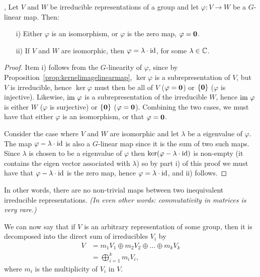 \begin{theorem}\cite[Lemma.1.7.]{FultonHarris}, \cite[Prop.2.4.]{Serre}\label{thm:schur}
	Let $V$ and $W$ be irreducible representations of a group and let $\varphi: V \rightarrow W$ be a $G$-linear map. Then:
	\begin{itemize}
		\item[i)] Either $\varphi$ is an isomorphism, or $\varphi$ is the zero map, $\varphi = \mathbf{0}$.
		\item[ii)] If $V$ and $W$ are isomorphic, then $\varphi = \lambda \cdot \text{id}$, for some $\lambda \in \mathbb{C}$.
	\end{itemize}
\end{theorem}
\begin{proof}
	Item i) follows from the $G$-linearity of $\varphi$, since by Proposition~\ref{prop:kernelimagelinearmap}, $\ker \varphi$ is a subrepresentation of $V$, but $V$ is irreducible, hence $\ker \varphi$ must then be all of $V$ ($\varphi = \mathbf{0}$) or $\{\mathbf{0}\}$ ($\varphi$ is injective). Likewise, $\text{im } \varphi$ is a subrepresentation of the irreducible $W$, hence $\text{im } \varphi$ is either $W$ ($\varphi$ is surjective) or $\{\mathbf{0}\}$ ($\varphi = \mathbf{0}$). Combining the two cases, we must have that either $\varphi$ is an isomorphism, or that $\varphi = \mathbf{0}$.
	
	Consider the case where $V$ and $W$ are isomorphic and let $\lambda$ be a eigenvalue of $\varphi$. The map $\varphi - \lambda \cdot \text{id}$ is also a $G$-linear map since it is the sum of two such maps. Since $\lambda$ is chosen to be a eigenvalue of $\varphi$ then $\ker(\varphi - \lambda \cdot \text{id})$ is non-empty (it contains the eigen vector associated with $\lambda$) so by part i) of this proof we must have that $\varphi - \lambda \cdot \text{id}$ is the zero map, hence $\varphi = \lambda \cdot \text{id}$, and ii) follows.
\end{proof}

In other words, there are no non-trivial maps between two inequivalent irreducible representations. \textit{(In even other words: commutativity in matrices is very rare.)}

We can now say that if $V$ is an arbitrary representation of some group, then it is decomposed into the direct sum of irreducibles $V_i$ by
\begin{align*}
	V &= m_1 V_1 \oplus m_2 V_2 \oplus \dots \oplus m_k V_k \\
	&= \bigoplus_{i=1}^k m_i V_i,
\end{align*}
where $m_i$ is the multiplicity of $V_i$ in $V$.

